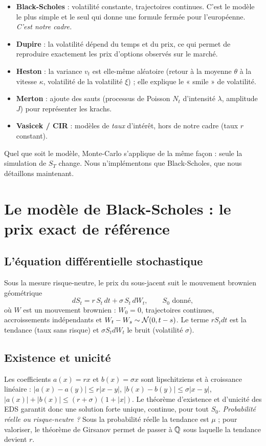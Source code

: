 \begin{itemize}[nosep]
\item \textbf{Black-Scholes} : volatilité constante, trajectoires continues. C'est le modèle le plus simple et le seul qui donne une formule fermée pour l'européenne. \emph{C'est notre cadre.}
\item \textbf{Dupire} : la volatilité dépend du temps et du prix, ce qui permet de reproduire exactement les prix d'options observés sur le marché.
\item \textbf{Heston} : la variance $v_t$ est elle-même aléatoire (retour à la moyenne $\theta$ à la vitesse $\kappa$, volatilité de la volatilité $\xi$) ; elle explique le « smile » de volatilité.
\item \textbf{Merton} : ajoute des sauts (processus de Poisson $N_t$ d'intensité $\lambda$, amplitude $J$) pour représenter les krachs.
\item \textbf{Vasicek / CIR} : modèles de \emph{taux} d'intérêt, hors de notre cadre (taux $r$ constant).
\end{itemize}
Quel que soit le modèle, Monte-Carlo s'applique de la même façon : seule la simulation de $S_T$ change. Nous n'implémentons que Black-Scholes, que nous détaillons maintenant.

\section{Le modèle de Black-Scholes : le prix exact de référence}

\subsection{L'équation différentielle stochastique}
Sous la mesure risque-neutre, le prix du sous-jacent suit le mouvement brownien géométrique
\[
dS_t = r\,S_t\,dt + \sigma\,S_t\,dW_t ,\qquad S_0 \text{ donné},
\]
où $W$ est un mouvement brownien : $W_0=0$, trajectoires continues, accroissements indépendants et $W_t-W_s\sim\mathcal{N}(0,t-s)$. Le terme $rS_tdt$ est la tendance (taux sans risque) et $\sigma S_tdW_t$ le bruit (volatilité $\sigma$).

\subsection{Existence et unicité}
Les coefficients $a(x) = rx$ et $b(x) = \sigma x$ sont lipschitziens et à croissance linéaire :
$|a(x)-a(y)| \le r|x-y|$, $|b(x)-b(y)|\le\sigma|x-y|$, $|a(x)|+|b(x)|\le (r+\sigma)(1+|x|)$.
Le théorème d'existence et d'unicité des EDS garantit donc une solution forte unique, continue, pour tout $S_0$.
\emph{Probabilité réelle ou risque-neutre ?} Sous la probabilité réelle la tendance est $\mu$ ; pour valoriser, le théorème de Girsanov permet de passer à $\mathbb{Q}$ sous laquelle la tendance devient $r$.

